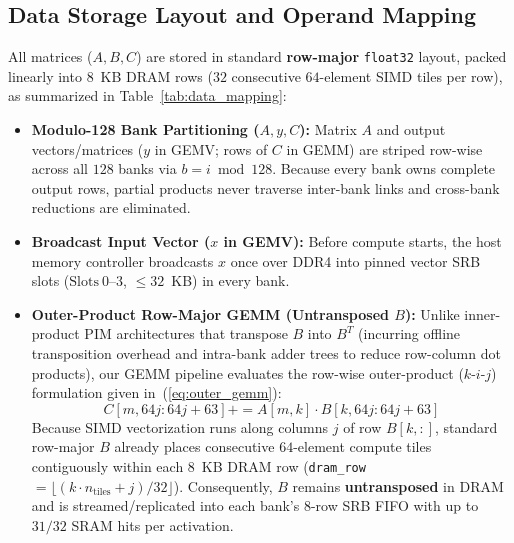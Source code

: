 \documentclass[conference]{IEEEtran}
\begin{document}
\subsection{Data Storage Layout and Operand Mapping}
All matrices ($A, B, C$) are stored in standard \textbf{row-major} \texttt{float32} layout, packed linearly into $8$~KB DRAM rows ($32$ consecutive $64$-element SIMD tiles per row), as summarized in Table~\ref{tab:data_mapping}:
\begin{itemize}
    \item \textbf{Modulo-128 Bank Partitioning ($A, y, C$):} Matrix $A$ and output vectors/matrices ($y$ in GEMV; rows of $C$ in GEMM) are striped row-wise across all $128$ banks via $b = i \bmod 128$. Because every bank owns complete output rows, partial products never traverse inter-bank links and cross-bank reductions are eliminated.
    \item \textbf{Broadcast Input Vector ($x$ in GEMV):} Before compute starts, the host memory controller broadcasts $x$ once over DDR4 into pinned vector SRB slots ($\text{Slots}~0\text{--}3$, $\le 32$~KB) in every bank.
    \item \textbf{Outer-Product Row-Major GEMM (Untransposed $B$):} Unlike inner-product PIM architectures that transpose $B$ into $B^T$ (incurring offline transposition overhead and intra-bank adder trees to reduce row-column dot products), our GEMM pipeline evaluates the row-wise outer-product ($k$-$i$-$j$) formulation given in~(\ref{eq:outer_gemm}):
    \begin{equation}
        C[m, 64j : 64j{+}63] += A[m, k] \cdot B[k, 64j : 64j{+}63]
        \label{eq:outer_gemm}
    \end{equation}
    Because SIMD vectorization runs along columns $j$ of row $B[k, :]$, standard row-major $B$ already places consecutive $64$-element compute tiles contiguously within each $8$~KB DRAM row (\texttt{dram\_row} $= \lfloor (k \cdot n_{\text{tiles}} + j)/32 \rfloor$). Consequently, $B$ remains \textbf{untransposed} in DRAM and is streamed/replicated into each bank's 8-row SRB FIFO with up to $31/32$ SRAM hits per activation.
\end{itemize}
\end{document}
